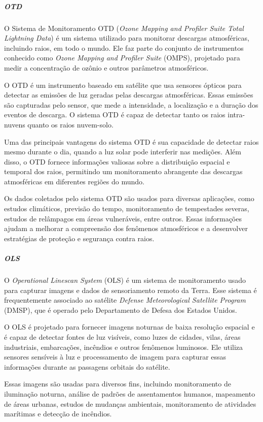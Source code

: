 \documentclass[a4paper, 12pt, onecolumn,singlespacing]{article}
\begin{document}
	\subparagraph{OTD}
	
	O Sistema de Monitoramento OTD (\textit{Ozone Mapping and Profiler Suite Total Lightning Data}) é um sistema utilizado para monitorar descargas atmosféricas, incluindo raios, em todo o mundo. Ele faz parte do conjunto de instrumentos conhecido como \textit{Ozone Mapping and Profiler Suite} (OMPS), projetado para medir a concentração de ozônio e outros parâmetros atmosféricos.
	
	O OTD é um instrumento baseado em satélite que usa sensores ópticos para detectar as emissões de luz geradas pelas descargas atmosféricas. Essas emissões são capturadas pelo sensor, que mede a intensidade, a localização e a duração dos eventos de descarga. O sistema OTD é capaz de detectar tanto os raios intra-nuvens quanto os raios nuvem-solo.
	
	Uma das principais vantagens do sistema OTD é sua capacidade de detectar raios mesmo durante o dia, quando a luz solar pode interferir nas medições. Além disso, o OTD fornece informações valiosas sobre a distribuição espacial e temporal dos raios, permitindo um monitoramento abrangente das descargas atmosféricas em diferentes regiões do mundo.
	
	Os dados coletados pelo sistema OTD são usados para diversas aplicações, como estudos climáticos, previsão do tempo, monitoramento de tempestades severas, estudos de relâmpagos em áreas vulneráveis, entre outros. Essas informações ajudam a melhorar a compreensão dos fenômenos atmosféricos e a desenvolver estratégias de proteção e segurança contra raios.
	
	\subparagraph{OLS}
	
	O \textit{Operational Linescan System} (OLS) é um sistema de monitoramento usado para capturar imagens e dados de sensoriamento remoto da Terra. Esse sistema é frequentemente associado ao satélite \textit{Defense Meteorological Satellite Program} (DMSP), que é operado pelo Departamento de Defesa dos Estados Unidos.
	
	O OLS é projetado para fornecer imagens noturnas de baixa resolução espacial e é capaz de detectar fontes de luz visíveis, como luzes de cidades, vilas, áreas industriais, embarcações, incêndios e outros fenômenos luminosos. Ele utiliza sensores sensíveis à luz e processamento de imagem para capturar essas informações durante as passagens orbitais do satélite.
	
	Essas imagens são usadas para diversos fins, incluindo monitoramento de iluminação noturna, análise de padrões de assentamentos humanos, mapeamento de áreas urbanas, estudos de mudanças ambientais, monitoramento de atividades marítimas e detecção de incêndios.
	
\end{document}
